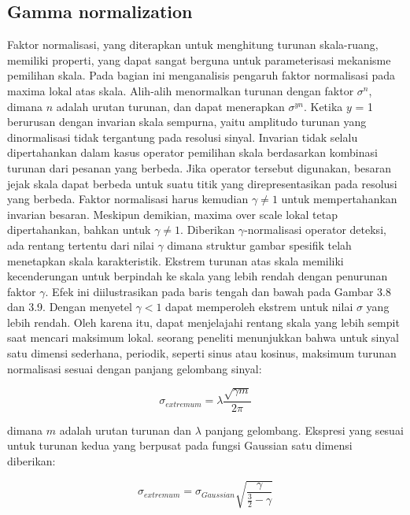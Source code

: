 \subsection{Gamma normalization}
Faktor normalisasi, yang diterapkan untuk menghitung turunan skala-ruang, memiliki properti, yang dapat sangat 
berguna untuk parameterisasi mekanisme pemilihan skala. Pada bagian ini menganalisis pengaruh faktor 
normalisasi pada maxima lokal atas skala. Alih-alih menormalkan turunan dengan faktor \(\sigma^{n}\), 
dimana \(n\) adalah urutan turunan, dan dapat menerapkan \(\sigma^{yn}\). Ketika \(y\) = 1 berurusan 
dengan invarian skala sempurna, yaitu amplitudo turunan yang dinormalisasi tidak tergantung pada resolusi sinyal. 
Invarian tidak selalu dipertahankan dalam kasus operator pemilihan skala berdasarkan kombinasi turunan dari pesanan yang berbeda.
Jika operator tersebut digunakan, besaran jejak skala dapat berbeda untuk suatu titik yang direpresentasikan pada resolusi yang berbeda. 
Faktor normalisasi harus kemudian \(\gamma \neq 1\) untuk mempertahankan invarian besaran. Meskipun demikian, maxima over scale lokal tetap 
dipertahankan, bahkan untuk \(\gamma \neq 1\). Diberikan \(\gamma\)-normalisasi operator deteksi, ada rentang tertentu dari nilai \(\gamma\) 
dimana struktur gambar spesifik telah menetapkan skala karakteristik.
Ekstrem turunan atas skala memiliki kecenderungan untuk berpindah ke skala yang lebih rendah dengan penurunan faktor \(\gamma\). Efek ini diilustrasikan pada baris tengah dan bawah pada Gambar 3.8 dan 3.9. Dengan menyetel \(\gamma < 1\) dapat memperoleh ekstrem untuk nilai \(\sigma\) yang lebih rendah. 
Oleh karena itu, dapat menjelajahi rentang skala yang lebih sempit saat mencari maksimum lokal. seorang peneliti menunjukkan bahwa untuk 
sinyal satu dimensi sederhana, periodik, seperti sinus atau kosinus, maksimum turunan normalisasi sesuai dengan panjang gelombang sinyal:

\begin{equation}
  \sigma_{extremum} = \lambda \frac{\sqrt{\gamma m} }{2\pi }
\end{equation}

dimana \(m\) adalah urutan turunan dan \(\lambda\) panjang gelombang. Ekspresi yang sesuai untuk turunan kedua yang berpusat pada fungsi Gaussian satu dimensi diberikan:

\begin{equation}
  \sigma_{extremum} = \sigma_{Gaussian} \sqrt{\frac{\gamma}{\frac{3}{2}- \gamma}}
\end{equation}

